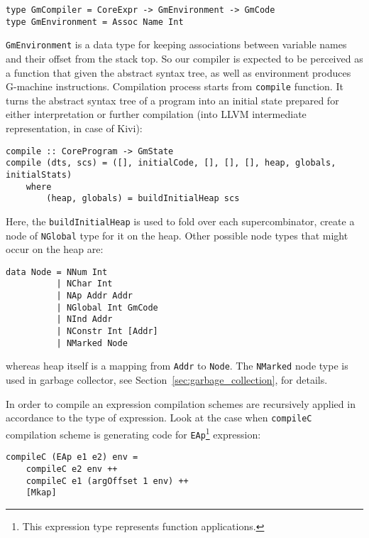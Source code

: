 \documentclass[12pt,a4paper]{report}
\begin{document}
\hspace*{-1.5in}
\begin{lstlisting}[style=haskell]
type GmCompiler = CoreExpr -> GmEnvironment -> GmCode
type GmEnvironment = Assoc Name Int
\end{lstlisting}

\texttt{GmEnvironment} is a data type for keeping associations between variable
names and their offset from the stack top. So our compiler is expected to be
perceived as a function that given the abstract syntax tree, as well as
environment produces G-machine instructions. Compilation process starts from
\texttt{compile} function. It turns the abstract syntax tree of a program into
an initial state prepared for either interpretation or further compilation (into
LLVM intermediate representation, in case of Kivi):

\hspace*{-1.5in}
\begin{lstlisting}[style=haskell]
compile :: CoreProgram -> GmState
compile (dts, scs) = ([], initialCode, [], [], [], heap, globals, initialStats)
    where
        (heap, globals) = buildInitialHeap scs
\end{lstlisting}

Here, the \texttt{buildInitialHeap} is used to fold over each supercombinator,
create a node of \texttt{NGlobal} type for it on the heap. Other possible node
types that might occur on the heap are:

\hspace*{-1.5in}
\begin{lstlisting}[style=haskell]
data Node = NNum Int
          | NChar Int
          | NAp Addr Addr
          | NGlobal Int GmCode
          | NInd Addr
          | NConstr Int [Addr]
          | NMarked Node
\end{lstlisting}

whereas heap itself is a mapping from \texttt{Addr} to \texttt{Node}. The
\texttt{NMarked} node type is used in garbage collector, see
Section~\ref{sec:garbage_collection}, for details.

In order to compile an expression compilation schemes are recursively applied
in accordance to the type of expression. Look at the case when
\texttt{compileC} compilation scheme is generating code for
\texttt{EAp}\footnote{This expression type represents function applications.}
expression:

\hspace*{-1.5in}
\begin{lstlisting}[style=haskell]
compileC (EAp e1 e2) env =
    compileC e2 env ++
    compileC e1 (argOffset 1 env) ++
    [Mkap]
\end{lstlisting}
\end{document}
